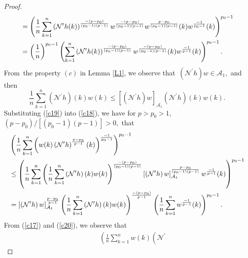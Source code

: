 \documentclass[a4paper]{amsart}
\theoremstyle{plain}
\numberwithin{equation}{section}
\begin{document}
\begin{proof}
\begin{align}
& =\left( \frac{1}{n}\sum\limits_{k=1}^{n}\left( \mathcal{N}^{\prime
}h(k)\right) ^{\frac{-\left( p-p_{0}\right) }{\left( p_{0}-1\right) \left(
p-1\right) }}w^{\frac{-\left( p-p_{0}\right) }{\left( p_{0}-1\right) \left(
p-1\right) }}w^{\frac{p-p_{0}}{\left( p_{0}-1\right) \left( p-1\right) }%
}(k)w^{\frac{-1}{p_{0}-1}}(k)\right) ^{p_{0}-1}  \notag \\
& =\left( \frac{1}{n}\right) ^{p_{0}-1}\left( \sum\limits_{k=1}^{n}\left( 
\mathcal{N}^{\prime }h(k)\right) ^{\frac{-\left( p-p_{0}\right) }{\left(
p_{0}-1\right) \left( p-1\right) }}w^{\frac{-\left( p-p_{0}\right) }{\left(
p_{0}-1\right) \left( p-1\right) }}(k)w^{\frac{-1}{p-1}}(k)\right)
^{p_{0}-1}.  \label{c18}
\end{align}%
From\ the property $(c)$ in Lemma \ref{L1}, we observe that\ $\left( 
\mathcal{N}^{\prime }h\right) w\in \mathcal{A}_{1},$ and then 
\begin{equation}
\frac{1}{n}\sum\limits_{k=1}^{n}\left( \mathcal{N}^{\prime }h\right)
(k)w(k)\leq \left[ \left( \mathcal{N}^{\prime }h\right) w\right] _{\mathcal{A%
}_{1}}\left( \mathcal{N}^{\prime }h\right) (k)w(k).  \label{c19}
\end{equation}%
Substituting (\ref{c19}) into (\ref{c18}), we have for $p>p_{0}>1,$ $\left(
p-p_{0}\right) /\left[ \left( p_{0}-1\right) \left( p-1\right) \right] >0,$
that%
\begin{align}
& \left( \frac{1}{n}\sum\limits_{k=1}^{n}\left( w(k)\left( \mathcal{N}%
^{\prime }h\right) ^{\frac{p-p_{0}}{p-1}}(k)\right) ^{\frac{-1}{p_{0}-1}%
}\right) ^{p_{0}-1}  \notag \\
& \leq \left( \frac{1}{n}\sum\limits_{k=1}^{n}\left( \frac{1}{n}%
\sum\limits_{k=1}^{n}\left( \mathcal{N}^{\prime }h\right) (k)w(k)\right) ^{%
\frac{-\left( p-p_{0}\right) }{\left( p_{0}-1\right) \left( p-1\right) }}%
\left[ \left( \mathcal{N}^{\prime }h\right) w\right] _{\mathcal{A}_{1}}^{%
\frac{p-p_{0}}{\left( p_{0}-1\right) \left( p-1\right) }}w^{\frac{-1}{p-1}%
}(k)\right) ^{p_{0}-1}  \notag \\
& =\left[ \left( \mathcal{N}^{\prime }h\right) w\right] _{\mathcal{A}_{1}}^{%
\frac{p-p_{0}}{p-1}}\left( \frac{1}{n}\sum\limits_{k=1}^{n}\left( \mathcal{N}%
^{\prime }h\right) (k)w(k)\right) ^{\frac{-\left( p-p_{0}\right) }{p-1}%
}\left( \frac{1}{n}\sum\limits_{k=1}^{n}w^{\frac{-1}{p-1}}(k)\right)
^{p_{0}-1}.  \label{c20}
\end{align}%
From (\ref{c17}) and (\ref{c20}), we observe that%
\begin{eqnarray*}
&&\left( \frac{1}{n}\sum\limits_{k=1}^{n}w(k)\left( \mathcal{N}^{\prime
}
\end{eqnarray*}
\end{proof}
\end{document}
